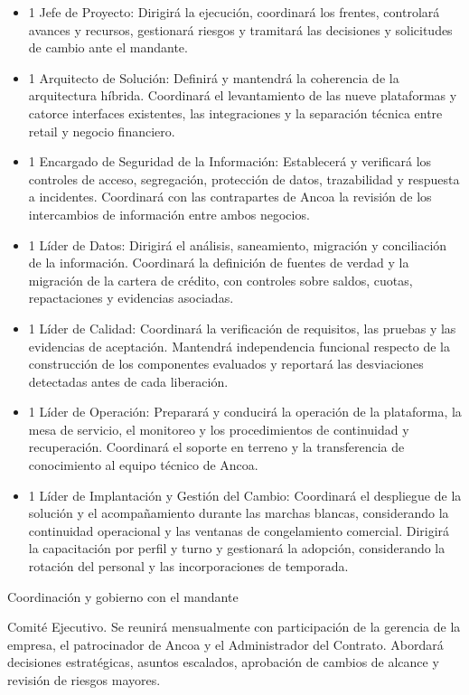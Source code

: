 \documentclass[11pt]{article}
\providecommand{\tightlist}{%
  \setlength{\itemsep}{0pt}\setlength{\parskip}{0pt}}
\begin{document}
\begin{itemize}
\tightlist
\item
  1 Jefe de Proyecto: Dirigirá la ejecución, coordinará los frentes, controlará avances y recursos, gestionará riesgos y tramitará las decisiones y solicitudes de cambio ante el mandante.
\item
  1 Arquitecto de Solución: Definirá y mantendrá la coherencia de la arquitectura híbrida. Coordinará el levantamiento de las nueve plataformas y catorce interfaces existentes, las integraciones y la separación técnica entre retail y negocio financiero.
\item
  1 Encargado de Seguridad de la Información: Establecerá y verificará los controles de acceso, segregación, protección de datos, trazabilidad y respuesta a incidentes. Coordinará con las contrapartes de Ancoa la revisión de los intercambios de información entre ambos negocios.
\item
  1 Líder de Datos: Dirigirá el análisis, saneamiento, migración y conciliación de la información. Coordinará la definición de fuentes de verdad y la migración de la cartera de crédito, con controles sobre saldos, cuotas, repactaciones y evidencias asociadas.
\item
  1 Líder de Calidad: Coordinará la verificación de requisitos, las pruebas y las evidencias de aceptación. Mantendrá independencia funcional respecto de la construcción de los componentes evaluados y reportará las desviaciones detectadas antes de cada liberación.
\item
  1 Líder de Operación: Preparará y conducirá la operación de la plataforma, la mesa de servicio, el monitoreo y los procedimientos de continuidad y recuperación. Coordinará el soporte en terreno y la transferencia de conocimiento al equipo técnico de Ancoa.
\item
  1 Líder de Implantación y Gestión del Cambio: Coordinará el despliegue de la solución y el acompañamiento durante las marchas blancas, considerando la continuidad operacional y las ventanas de congelamiento comercial. Dirigirá la capacitación por perfil y turno y gestionará la adopción, considerando la rotación del personal y las incorporaciones de temporada.
\end{itemize}

Coordinación y gobierno con el mandante

Comité Ejecutivo. Se reunirá mensualmente con participación de la gerencia de la empresa, el patrocinador de Ancoa y el Administrador del Contrato. Abordará decisiones estratégicas, asuntos escalados, aprobación de cambios de alcance y revisión de riesgos mayores.
\end{document}
